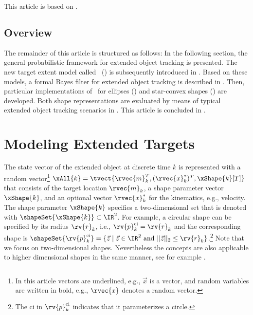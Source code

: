 \documentclass[preprint,1p,11pt]{ISAS_IR}
\begin{document}
\begin{Remark} This article is based on   \cite{SDF10_Baum,Fusion11_Baum-RHM,ISSPIT09_Baum,Fusion10_BaumNoack,CDC11_Baum,Fusion10_BaumKlumpp,IROS11_Baum,SYSAES_Baum,Diss13_Baum}.
\end{Remark}
\section{Overview}

The remainder of this article is structured as follows:
In the following section, the general probabilistic framework for extended object tracking is presented.
The new target extent model called \RHM\ (\rhm)  is subsequently introduced in    .
Based on these models, a formal Bayes filter for extended object tracking is described in .
Then,  particular implementations of \rhms\ for  ellipses () and star-convex shapes () are developed.
Both shape representations are evaluated by means of typical extended object tracking scenarios in . This article is concluded in .


\chapter{Modeling Extended Targets}
The  state vector of the extended object at discrete time  $k$  is represented with a random vector\footnote{In this article vectors are underlined, e.g., $\vec{x}$ is a vector,  and random variables are written in bold, e.g., $\rvec{x}$  denotes a random vector.} $\xAll{k}=\tvect{ \rvec{m}^T_k, (\rvec{x}^*_k)^T, \xShape{k}[T] }$ that consists of the target location $\rvec{m}_k$, a shape parameter vector $\xShape{k}$,  and an optional  vector $\rvec{x}^*_k$ for the kinematics, e.g., velocity.
The shape parameter $\xShape{k}$  specifies a two-dimensional set that  is denoted with $\shapeSet{\xShape{k}} \subset \IR^2$.
For example, a circular shape can be specified by its radius $\rv{r}_k$, i.e.,  $\rv{p}^\text{ci}_k = \rv{r}_k$  and  the corresponding  shape is  $\shapeSet{ \rv{p}^\text{ci}_k}=\{ \vec{z}  \; | \;    \vec{z} \in \IR^2 \text{ and } ||\vec{z}||_2 \leq  \rv{r}_k \}$.\footnote{The $\text{ci}$ in  $\rv{p}^{\text{ci}}_k$ indicates that it parameterizes a circle.}
Note that we focus on two-dimensional shapes. Nevertheless the concepts are also applicable to higher dimensional shapes in the same manner, see for example \cite{Fusion12_Faion-CylinderTracking}.
\end{document}

